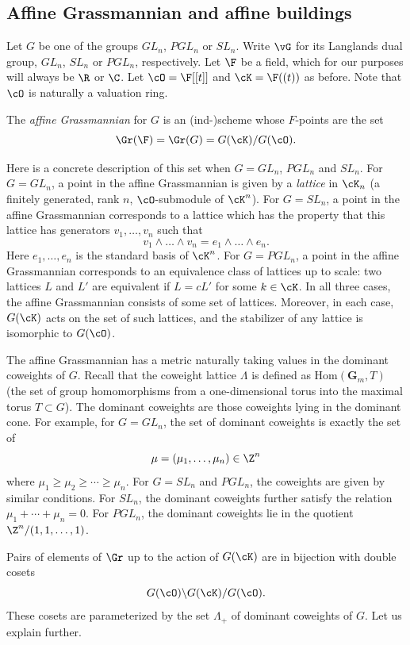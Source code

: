 \subsection{Affine Grassmannian and affine buildings}

Let $G$ be one of the groups $GL_n$, $PGL_n$ or $SL_n$. Write $\vG$ for its Langlands dual group, $GL_n$, $SL_n$ or $PGL_n$, respectively. Let $\F$ be a field, which for our purposes will always be $\R$ or $\C$. Let $\cO=\F[[t]]$ and $\cK=\F((t))$ as before. Note that $\cO$ is naturally a valuation ring.


The \emph{affine Grassmannian} for $G$ is an (ind-)scheme whose $F$-points are the set
\[
\Gr(\F) = \Gr(G) = G(\cK)/G(\cO).
\]

Here is a concrete description of this set when $G=GL_n$, $PGL_n$ and $SL_n$. For $G=GL_n$, a point in the affine Grassmannian is given by a \emph{lattice} in $\cK_n$ (a finitely generated, rank $n$, $\cO$-submodule of $\cK^n$). For $G=SL_n$, a point in the affine Grassmannian corresponds to a lattice which has the property that this lattice has generators $v_1, \dots, v_n$ such that
\[
v_1 \wedge \dots \wedge v_n=e_1 \wedge \dots \wedge e_n.
\]
Here $e_1, \dots, e_n$ is the standard basis of $\cK^n$. For $G=PGL_n$, a point in the affine Grassmannian corresponds to an equivalence class of lattices up to scale: two lattices $L$ and $L'$ are equivalent if $L=cL'$ for some $k \in \cK$. In all three cases, the affine Grassmannian consists of some set of lattices. Moreover, in each case, $G(\cK)$ acts on the set of such lattices, and the stabilizer of any lattice is isomorphic to $G(\cO)$.

The affine Grassmannian has a metric naturally taking values in the dominant coweights of $G$. Recall that the coweight lattice $\Lambda$ is defined as $\mathrm{Hom}(\mathbf{G}_m,T)$ (the set of group homomorphisms from a one-dimensional torus into the maximal torus $T \subset G$). The dominant coweights are those coweights lying in the dominant cone. For example, for $G=GL_n$, the set of dominant coweights is exactly the set of 
\[
\mu=(\mu_1, \dots, \mu_n) \in \Z^n
\]
where $\mu_1 \geq \mu_2 \geq \cdots \geq \mu_n$. For $G=SL_n$ and $PGL_n$, the coweights are given by similar conditions. For $SL_n$, the dominant coweights further satisfy the relation $\mu_1+\cdots+\mu_n=0$. For $PGL_n$, the dominant coweights lie in the quotient $\Z^n/(1, 1, \dots, 1)$.

Pairs of elements of $\Gr$ up to the action of $G(\cK)$ are in bijection with double cosets 
\[
G(\cO) \backslash G(\cK) / G(\cO).
\]
 These cosets are parameterized by the set $\Lambda_+$ of dominant coweights of $G$. Let us explain further.

